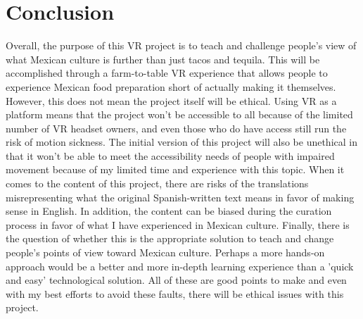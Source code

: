 \documentclass[11pt,twocolumn]{article}
\begin{document}
\section{Conclusion}
Overall, the purpose of this VR project is to teach and challenge people’s view of what Mexican culture is further than just tacos and tequila. This will be accomplished through a farm-to-table VR experience that allows people to experience Mexican food preparation short of actually making it themselves. However, this does not mean the project itself will be ethical. Using VR as a platform means that the project won’t be accessible to all because of the limited number of VR headset owners, and even those who do have access still run the risk of motion sickness. The initial version of this project will also be unethical in that it won’t be able to meet the accessibility needs of people with impaired movement because of my limited time and experience with this topic. When it comes to the content of this project, there are risks of the translations misrepresenting what the original Spanish-written text means in favor of making sense in English. In addition, the content can be biased during the curation process in favor of what I have experienced in Mexican culture. Finally, there is the question of whether this is the appropriate solution to teach and change people’s points of view toward Mexican culture. Perhaps a more hands-on approach would be a better and more in-depth learning experience than a 'quick and easy' technological solution. All of these are good points to make and even with my best efforts to avoid these faults, there will be ethical issues with this project. 


\printbibliography 
\end{document}
